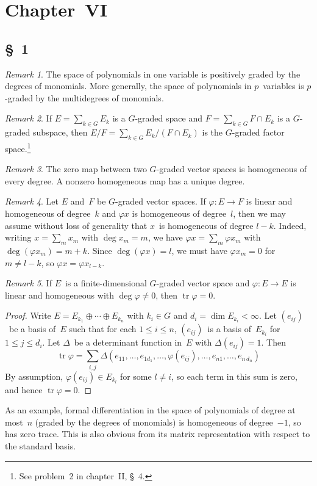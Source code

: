 \documentclass[letterpaper,12pt]{article}
\DeclareMathOperator{\tr}{tr}
\newcommand{\sect}{\cap}
\newcommand{\dsum}{\oplus}
\theoremstyle{definition}
\theoremstyle{remark}
\newtheorem*{rmk}{Remark}
\begin{document}
\section*{Chapter~VI}
\subsection*{\S~1}
\begin{rmk}
The space of polynomials in one variable is positively graded by the degrees of monomials. More generally, the space of polynomials in \(p\)~variables is \(p\)-graded by the multidegrees of monomials.
\end{rmk}

\begin{rmk}
If \(E=\sum_{k\in G}E_k\) is a \(G\)-graded space and \(F=\sum_{k\in G}F\sect E_k\) is a \(G\)-graded subspace, then \(E/F=\sum_{k\in G}E_k/(F\sect E_k)\) is the \(G\)-graded factor space.\footnote{See problem~2 in chapter~II, \S~4.}
\end{rmk}

\begin{rmk}
The zero map between two \(G\)-graded vector spaces is homogeneous of every degree. A nonzero homogeneous map has a unique degree.
\end{rmk}

\begin{rmk}
Let \(E\) and~\(F\) be \(G\)-graded vector spaces. If \(\varphi:E\to F\) is linear and homogeneous of degree~\(k\) and \(\varphi x\) is homogeneous of degree~\(l\), then we may assume without loss of generality that \(x\)~is homogeneous of degree \(l-k\). Indeed, writing \(x=\sum_m x_m\) with \(\deg x_m=m\), we have \(\varphi x=\sum_m\varphi x_m\) with \(\deg(\varphi x_m)=m+k\). Since \(\deg(\varphi x)=l\), we must have \(\varphi x_m=0\) for \(m\ne l-k\), so \(\varphi x=\varphi x_{l-k}\).
\end{rmk}

\begin{rmk}
If \(E\)~is a finite-dimensional \(G\)-graded vector space and \(\varphi:E\to E\) is linear and homogeneous with \(\deg\varphi\ne 0\), then \(\tr\varphi=0\).
\end{rmk}
\begin{proof}
Write \(E=E_{k_1}\dsum\cdots\dsum E_{k_n}\) with \(k_i\in G\) and \(d_i=\dim E_{k_i}<\infty\). Let \((e_{ij})\)~be a basis of~\(E\) such that for each \(1\le i\le n\), \((e_{ij})\)~is a basis of~\(E_{k_i}\) for \(1\le j\le d_i\). Let \(\Delta\)~be a determinant function in~\(E\) with \(\Delta(e_{ij})=1\). Then
\[\tr\varphi=\sum_{i,j}\Delta(e_{11},\ldots,e_{1d_1},\ldots,\varphi(e_{ij}),\ldots,e_{n1},\ldots,e_{n\,d_n})\]
By assumption, \(\varphi(e_{ij})\in E_{k_l}\) for some \(l\ne i\), so each term in this sum is zero, and hence \(\tr\varphi=0\).
\end{proof}
\noindent As an example, formal differentiation in the space of polynomials of degree at most~\(n\) (graded by the degrees of monomials) is homogeneous of degree~\(-1\), so has zero trace. This is also obvious from its matrix representation with respect to the standard basis.
\end{document}
